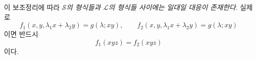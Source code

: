 
이 보조정리에 따라 \emph{$\mathcal S$의 형식들과 $\mathcal L$의 형식들 사이에는 일대일 대응이 존재한다}. 실제로
\[
  f_1(x,y,\lambda_1x+\lambda_2y)=g(\lambda;xy),\qquad
  f_2(x,y,\lambda_1x+\lambda_2y)=g(\lambda;xy)
\]
이면 반드시
\[
  f_1(xyz)=f_2(xyz)
\]
이다.
